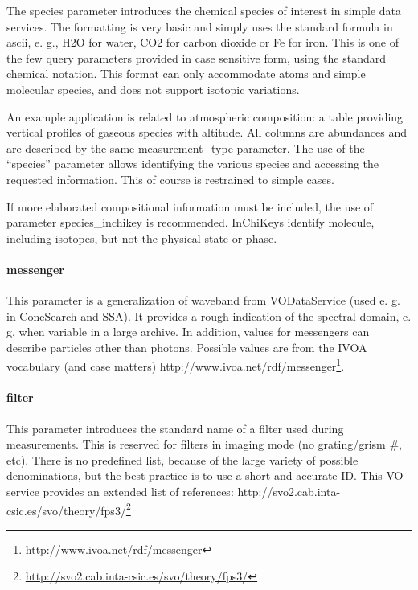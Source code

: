 \documentclass[11pt,a4paper]{ivoa}
\begin{document}
The species parameter introduces the chemical species of interest in simple data services. The formatting is very basic and simply uses the standard formula in ascii, e. g., H2O for water, CO2 for carbon dioxide or Fe for iron. This is one of the few query parameters provided in case sensitive form, using the standard chemical notation. This format can only accommodate atoms and simple molecular species, and does not support isotopic variations.  

An example application is related to atmospheric composition: a table providing vertical profiles of gaseous species with altitude. All columns are abundances and are described by the same measurement\_type parameter. The use of the ``species'' parameter allows identifying the various species and accessing the requested information. This of course is restrained to simple cases.

If more elaborated compositional information must be included, the use of parameter species\_inchikey is recommended. InChiKeys identify molecule, including isotopes, but not the physical state or phase.\\

\paragraph{messenger}

This parameter is a generalization of waveband from VODataService (used e. g. in ConeSearch and SSA). It provides a rough indication of the spectral domain, e. g. when variable in a large archive. In addition, values for messengers can describe particles other than photons. Possible values are from the IVOA vocabulary (and case matters) http://www.ivoa.net/rdf/messenger\footnote{\url{http://www.ivoa.net/rdf/messenger}}.

\paragraph{filter}

This parameter introduces the standard name of a filter used during measurements. This is reserved for filters in imaging mode (no grating/grism \#, etc). There is no predefined list, because of the large variety of possible denominations, but the best practice is to use a short and accurate ID. This VO service provides an extended list of references: http://svo2.cab.inta-csic.es/svo/theory/fps3/\footnote{\url{http://svo2.cab.inta-csic.es/svo/theory/fps3/}}
\end{document}
